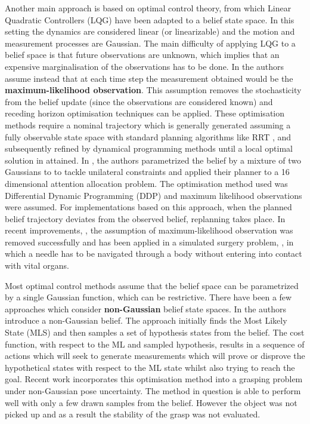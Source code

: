 Another main approach is based on optimal control theory, from which Linear Quadratic Controllers (LQG) have been adapted to a belief state space. 
In this setting the dynamics are considered linear (or linearizable) and the motion and measurement processes are Gaussian. The main difficulty of 
applying LQG to a belief space is that future observations are unknown, which implies that an expensive marginalisation of the observations has to be done. 
In \cite{bsp_rss_2010a} the authors assume instead that at each time step the measurement obtained would be the \textbf{maximum-likelihood observation}. 
This assumption removes the stochasticity from the belief update (since the observations are considered known) and receding horizon optimisation techniques 
can be applied. These optimisation methods require a nominal trajectory which is generally generated 
assuming a fully observable state space with standard planning algorithms like RRT \cite{LQG_MP_2011}, and subsequently refined by 
dynamical programming methods until a local optimal solution in attained. In \cite{Erez10ascalable}, the authors parametrized the belief by a mixture of two Gaussians to to tackle unilateral constraints
and applied their planner to a 16 dimensional attention allocation problem. The optimisation method used was Differential Dynamic Programming (DDP) and maximum likelihood 
observations were assumed. For implementations based on this approach, when the planned belief trajectory deviates from the observed belief, replanning takes place. 
In recent improvements, \cite{van_den_Berg_2012},  the assumption of maximum-likelihood observation was removed successfully
and has been applied in a simulated surgery problem, \cite{Needle_2014}, in which a needle has to be navigated through a body
without entering into contact with vital organs.

Most optimal control methods assume that the belief space can be parametrized by a single Gaussian function, which can be 
restrictive. There have been a few approaches which consider \textbf{non-Gaussian} belief state spaces.
In \cite{non_gauss_bel_plan_2012} the authors introduce a non-Gaussian belief. The approach initially finds the Most Likely State (MLS) 
and then samples a set of hypothesis states from the belief. The cost function, with respect to the ML and sampled hypothesis, results in a sequence of actions which will seek to generate measurements
which will prove or disprove the hypothetical states with respect to 
the ML state whilst also trying to reach the goal. Recent work \cite{seq_traj_replan_iros_2013} incorporates this optimisation method into a grasping problem under non-Gaussian pose
uncertainty. The method in question is able to perform well with only a few drawn samples from the belief. However the object was not picked up and as a result 
the stability of the grasp was not evaluated.  


